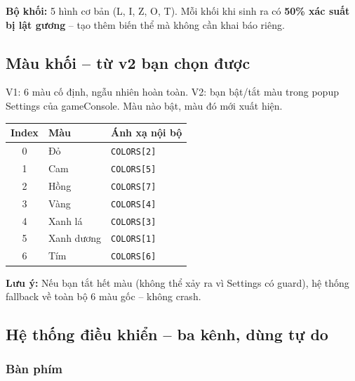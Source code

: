 \documentclass[12pt,a4paper]{article}
\renewcommand{\notebox}[1]{%
  \vspace{4pt}%
  \noindent\colorbox{cyan!12}{\begin{minipage}{0.96\linewidth}%
    \vspace{2pt}\textbf{Lưu ý:} #1\vspace{2pt}%
  \end{minipage}}%
  \vspace{4pt}%
}
\begin{document}
\noindent\textbf{Bộ khối:} 5 hình cơ bản (L, I, Z, O, T). Mỗi khối khi
sinh ra có \textbf{50\% xác suất bị lật gương} -- tạo thêm biến thể mà
không cần khai báo riêng.

\subsection{Màu khối -- từ v2 bạn chọn được}

V1: 6 màu cố định, ngẫu nhiên hoàn toàn. V2: bạn bật/tắt màu trong
popup Settings của gameConsole. Màu nào bật, màu đó mới xuất hiện.

\vspace{4pt}
\begin{tabularx}{\linewidth}{|c|l|X|}
    \hline
    \textbf{Index} & \textbf{Màu}    & \textbf{Ánh xạ nội bộ} \\
    \hline
    0 & Đỏ          & \texttt{COLORS[2]} \\
    \hline
    1 & Cam         & \texttt{COLORS[5]} \\
    \hline
    2 & Hồng        & \texttt{COLORS[7]} \\
    \hline
    3 & Vàng        & \texttt{COLORS[4]} \\
    \hline
    4 & Xanh lá     & \texttt{COLORS[3]} \\
    \hline
    5 & Xanh dương  & \texttt{COLORS[1]} \\
    \hline
    6 & Tím         & \texttt{COLORS[6]} \\
    \hline
\end{tabularx}

\notebox{Nếu bạn tắt hết màu (không thể xảy ra vì Settings có guard),
hệ thống fallback về toàn bộ 6 màu gốc -- không crash.}

\subsection{Hệ thống điều khiển -- ba kênh, dùng tự do}

\subsubsection{Bàn phím}
\end{document}
